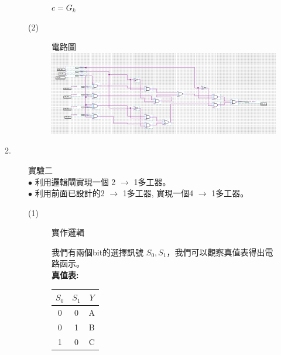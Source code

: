 \documentclass[12pt, a4paper]{article}
\begin{document}
\begin{description}
\begin{description}
\begin{description}
\begin{samepage}
                  $c = G_{k}$
                  \normalfont
                \end{samepage}
              \item [(2)] 電路圖 \\[.5cm]
                \includegraphics[width=13cm]{./image/ex1.png}          
            \end{description}
          \normalsize
          \fontsize{20pt}{22pt}\selectfont
        \item[2.] 實驗二 \\
              \fontsize{16pt}{18pt}\selectfont
                $\bullet$ 利用邏輯閘實現一個 2 $\rightarrow$ 1多工器。\\
                $\bullet$ 利用前面已設計的2 $\rightarrow$ 1多工器, 實現一個4 $\rightarrow$ 1多工器。
              \fontsize{18pt}{20pt}\selectfont
              \begin{description}
                \item[(1)] 實作邏輯\\
                  \fontsize{16pt}{18pt}
                  \begin{samepage}
                    我們有兩個bit的選擇訊號 $S_{0}, S_{1}$，我們可以觀察真值表得出電路函示。\\
                    \bf 真值表:
                    \begin{table}[h]
                      \centering
                      \begin{adjustbox}{width=.3\textwidth}
                        \begin{tabular}{ |c c|c| }
                          \hline
                          $S_{0}$ & $S_{1}$ & $Y$ \\
                          \hline
                          0 & 0 & A \\
                          \hline
                          0 & 1 & B \\
                          \hline
                          1 & 0 & C \\
                          \hline

\end{tabular}
\end{adjustbox}
\end{table}
\end{samepage}
\end{description}
\end{description}
\end{description}
\end{document}
